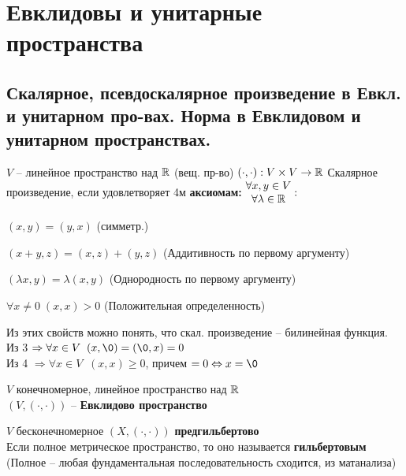 \documentclass[../main.tex]{subfiles}
\begin{document}
	\section{Евклидовы и унитарные пространства}
	\subsection{Скалярное, псевдоскалярное произведение в Евкл. и унитарном про-вах. Норма в Евклидовом и унитарном пространствах.}
	\begin{defin}
		$V$ -- линейное пространство над $\mathbb R$ (вещ. пр-во)\n
		$(\cdot, \cdot): V\times V \rightarrow \mathbb R$\n
		Скалярное произведение, если удовлетворяет 4м \textbf{аксиомам:}\n
		$\begin{matrix}
		\forall x, y \in V\\
		\forall \lambda \in \mathbb R
		\end{matrix}: $
		\begin{mylist}
			\item 
			$(x, y) = (y, x)$ (симметр.)
			\item 
			$(x+y, z) = (x, z) + (y, z)$ (Аддитивность по первому аргументу)
			\item $(\lambda x, y) = \lambda (x, y)$ (Однородность по первому аргументу)
			\item $\forall x \neq 0 \; (x, x) > 0 $ (Положительная определенность)
		\end{mylist}
		Из этих свойств можно понять, что скал. произведение -- билинейная функция.\\
		Из 3 $\Rightarrow \forall x \in V \; \; (x, \0) = (\0, x) = 0$\\
		Из 4 $\Rightarrow \forall x \in V \; \; (x, x) \geq 0$, причем $= 0 \Leftrightarrow x = \0$
	\end{defin}
	\begin{defin}
		$V$ конечномерное, линейное пространство над $\mathbb R$\\
		$(V, (\cdot, \cdot))$ -- \textbf{Евклидово пространство}
	\end{defin}
	\begin{remark}
		$V$ бесконечномерное $(X, (\cdot, \cdot))$ \textbf{предгильбертово}\\
		Если полное метрическое пространство, то оно называется \textbf{гильбертовым}\\
		(Полное -- любая фундаментальная последовательность сходится, из матанализа)
	\end{remark}
\end{document}
